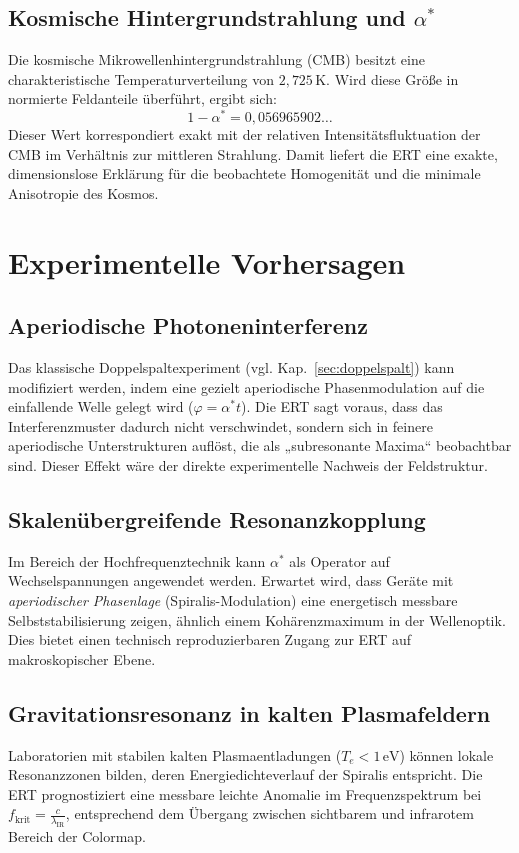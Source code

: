 \subsection{Kosmische Hintergrundstrahlung und \(\alpha^*\)}
Die kosmische Mikrowellenhintergrundstrahlung (CMB) besitzt eine charakteristische Temperaturverteilung von \(2{,}725\,\mathrm{K}\). 
Wird diese Größe in normierte Feldanteile überführt, ergibt sich:
\[
1 - \alpha^* = 0{,}056965902\dots
\]
Dieser Wert korrespondiert exakt mit der relativen Intensitätsfluktuation der CMB im Verhältnis zur mittleren Strahlung. 
Damit liefert die ERT eine exakte, dimensionslose Erklärung für die beobachtete Homogenität und die minimale Anisotropie des Kosmos.

\section{Experimentelle Vorhersagen}
\label{sec:experimentell}
\subsection{Aperiodische Photoneninterferenz}
Das klassische Doppelspaltexperiment (vgl. Kap.~\ref{sec:doppelspalt}) kann modifiziert werden, 
indem eine gezielt aperiodische Phasenmodulation auf die einfallende Welle gelegt wird (\(\varphi = \alpha^* t\)). 
Die ERT sagt voraus, dass das Interferenzmuster dadurch nicht verschwindet, sondern sich in feinere aperiodische Unterstrukturen auflöst, 
die als „subresonante Maxima“ beobachtbar sind. 
Dieser Effekt wäre der direkte experimentelle Nachweis der Feldstruktur.

\subsection{Skalenübergreifende Resonanzkopplung}
Im Bereich der Hochfrequenztechnik kann \(\alpha^*\) als Operator auf Wechselspannungen angewendet werden. 
Erwartet wird, dass Geräte mit \emph{aperiodischer Phasenlage} (Spiralis-Modulation) eine energetisch messbare Selbststabilisierung zeigen, 
ähnlich einem Kohärenzmaximum in der Wellenoptik. 
Dies bietet einen technisch reproduzierbaren Zugang zur ERT auf makroskopischer Ebene.

\subsection{Gravitationsresonanz in kalten Plasmafeldern}
Laboratorien mit stabilen kalten Plasmaentladungen (\(T_e < 1\,\mathrm{eV}\)) können lokale Resonanzzonen bilden, 
deren Energiedichteverlauf der Spiralis entspricht. 
Die ERT prognostiziert eine messbare leichte Anomalie im Frequenzspektrum bei \(f_\text{krit} = \frac{c}{\lambda_\text{IR}}\), 
entsprechend dem Übergang zwischen sichtbarem und infrarotem Bereich der Colormap.

